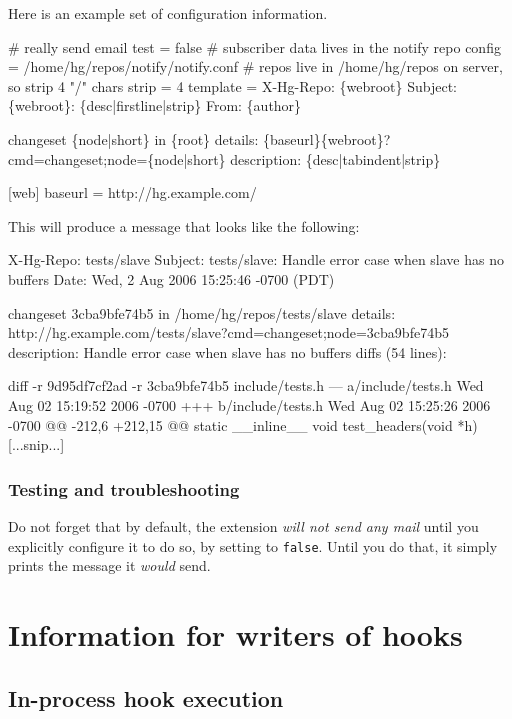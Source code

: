 Here is an example set of  configuration information.
\begin{codesample2}
  [notify]
  # really send email
  test = false
  # subscriber data lives in the notify repo
  config = /home/hg/repos/notify/notify.conf
  # repos live in /home/hg/repos on server, so strip 4 "/" chars
  strip = 4
  template = X-Hg-Repo: \{webroot\}
    Subject: \{webroot\}: \{desc|firstline|strip\}
    From: \{author\}

    changeset \{node|short\} in \{root\}
    details: \{baseurl\}\{webroot\}?cmd=changeset;node=\{node|short\}
    description:
      \{desc|tabindent|strip\}

  [web]
  baseurl = http://hg.example.com/
\end{codesample2}

This will produce a message that looks like the following:
\begin{codesample2}
  X-Hg-Repo: tests/slave
  Subject: tests/slave: Handle error case when slave has no buffers
  Date: Wed,  2 Aug 2006 15:25:46 -0700 (PDT)

  changeset 3cba9bfe74b5 in /home/hg/repos/tests/slave
  details: http://hg.example.com/tests/slave?cmd=changeset;node=3cba9bfe74b5
  description:
          Handle error case when slave has no buffers
  diffs (54 lines):

  diff -r 9d95df7cf2ad -r 3cba9bfe74b5 include/tests.h
  --- a/include/tests.h      Wed Aug 02 15:19:52 2006 -0700
  +++ b/include/tests.h      Wed Aug 02 15:25:26 2006 -0700
  @@ -212,6 +212,15 @@ static __inline__ void test_headers(void *h)
  [...snip...]
\end{codesample2}

\subsubsection{Testing and troubleshooting}

Do not forget that by default, the  extension \emph{will
  not send any mail} until you explicitly configure it to do so, by
setting  to \texttt{false}.  Until you do that,
it simply prints the message it \emph{would} send.

\section{Information for writers of hooks}
\label{sec:hook:ref}

\subsection{In-process hook execution}


